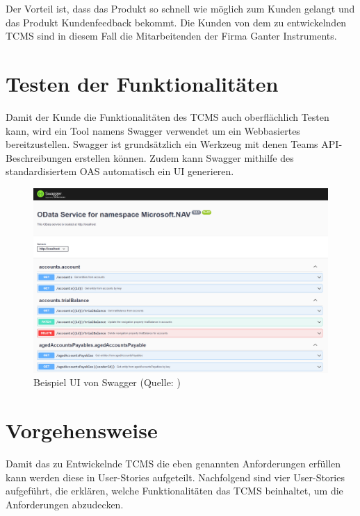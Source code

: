 \documentclass[a4paper, fontsize=11pt, parskip=half, twoside]{scrreprt}
\begin{document}
	Der Vorteil ist, dass das Produkt so schnell wie möglich zum Kunden gelangt und das Produkt Kundenfeedback bekommt.
	Die Kunden von dem zu entwickelnden \ac{TCMS} sind in diesem Fall die Mitarbeitenden der Firma Ganter Instruments.
	
	\textcite{alliance_what_2017}
	
	
	\section{Testen der Funktionalitäten}
	Damit der Kunde die Funktionalitäten des \ac{TCMS} auch oberflächlich Testen kann, wird ein Tool namens Swagger verwendet um ein Webbasiertes  bereitzustellen.
	Swagger ist grundsätzlich ein Werkzeug mit denen Teams \ac{API}-Beschreibungen erstellen können.
	Zudem kann Swagger mithilfe des standardisiertem \ac{OAS} automatisch ein \ac{UI} generieren.
	
	\textcite{noauthor_api_nodate}
	
	\begin{figure}[ht]
		\centering
		\includegraphics[scale=0.6]{assets/swaggerui.png}
		\caption{Beispiel \ac{UI} von Swagger (Quelle: \textcite{noauthor_host_nodate})}
	\end{figure}

	\section{Vorgehensweise} \label{sec:userStoriesDefinition}
	Damit das zu Entwickelnde \ac{TCMS} die eben genannten Anforderungen erfüllen kann werden diese in User-Stories aufgeteilt.
	Nachfolgend sind vier User-Stories aufgeführt, die erklären, welche Funktionalitäten das \ac{TCMS} beinhaltet, um die Anforderungen abzudecken.
	
\end{document}

